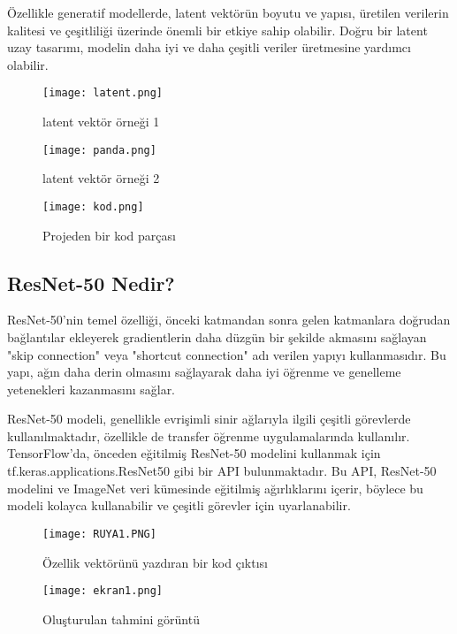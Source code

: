\documentclass[12pt]{article}
\begin{document}
Özellikle generatif modellerde, latent vektörün boyutu ve yapısı, üretilen verilerin kalitesi ve çeşitliliği üzerinde önemli bir etkiye sahip olabilir. Doğru bir latent uzay tasarımı, modelin daha iyi ve daha çeşitli veriler üretmesine yardımcı olabilir.
\begin{figure}[h]
    \centering
    \texttt{[image: latent.png]}
    \caption{latent vektör örneği 1 }
    \label{fig:enter-label}
\end{figure} 
\begin{figure}[h]
    \centering
    \texttt{[image: panda.png]}
    \caption{latent vektör örneği 2 }
    \label{fig:enter-label}
\end{figure} 

\begin{figure}[h]
    \centering
    \texttt{[image: kod.png]}
    \caption{Projeden bir kod parçası }
    \label{fig:enter-label}
\end{figure} 
\subsection{ResNet-50 Nedir?}
ResNet-50'nin temel özelliği, önceki katmandan sonra gelen katmanlara doğrudan bağlantılar ekleyerek gradientlerin daha düzgün bir şekilde akmasını sağlayan "skip connection" veya "shortcut connection" adı verilen yapıyı kullanmasıdır. Bu yapı, ağın daha derin olmasını sağlayarak daha iyi öğrenme ve genelleme yetenekleri kazanmasını sağlar.

ResNet-50 modeli, genellikle evrişimli sinir ağlarıyla ilgili çeşitli görevlerde kullanılmaktadır, özellikle de transfer öğrenme uygulamalarında kullanılır. TensorFlow'da, önceden eğitilmiş ResNet-50 modelini kullanmak için\\
tf.keras.applications.ResNet50 gibi bir API bulunmaktadır. Bu API, ResNet-50 modelini ve ImageNet veri kümesinde eğitilmiş ağırlıklarını içerir, böylece bu modeli kolayca kullanabilir ve çeşitli görevler için uyarlanabilir.
\begin{figure}[h]
    \centering
    \texttt{[image: RUYA1.PNG]}
    \caption{Özellik vektörünü yazdıran bir kod çıktısı}
    \label{fig:enter-label}
\end{figure}
\begin{figure}[h]
    \centering
    \texttt{[image: ekran1.png]}
    \caption{Oluşturulan tahmini görüntü }
    \label{fig:enter-label}
\end{figure}
\newpage
\end{document}

